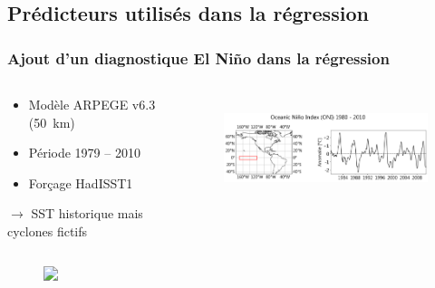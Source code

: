 \documentclass[aspectratio=169, usepdftitle=false, xcolor={dvipsnames}, 9pt,table]{beamer}
\begin{document}
\subsection{Prédicteurs utilisés dans la régression}
\begin{frame}[t]
    \frametitle{Ajout d'un diagnostique El Niño dans la régression}
    \scriptsize
    \begin{columns}
        \begin{column}{0.38\textwidth}
            \begin{definition}
                \setlength{\leftmargini}{2.5ex}
                \begin{itemize}
                    \item Modèle ARPEGE v6.3 (50~km) \parencite{voldoire_evaluation_2019}
                    \item Période 1979 -- 2010
                    \item Forçage HadISST1
                \end{itemize}
                $\longrightarrow$ SST \alert{historique} mais cyclones \alert{fictifs}
            \end{definition}
        \end{column}
        \begin{column}{0.62\textwidth}
            \vspace{-3em} 
            \begin{figure}[htpb]
                \centering
                \includegraphics[height=3cm]{Figures/ONI.png}
            \end{figure} 
        \end{column}
    \end{columns}
    \vspace{2em}
    \begin{columns}[t]
        \begin{column}{0.6\textwidth}
            \vspace{-3.5em}%
            \begin{figure}
                \includegraphics<2->[height=4.5cm]{Figures/biais_arpege_correlation_oni.png}
            \end{figure}

\end{column}
\end{columns}
\end{frame}
\end{document}
